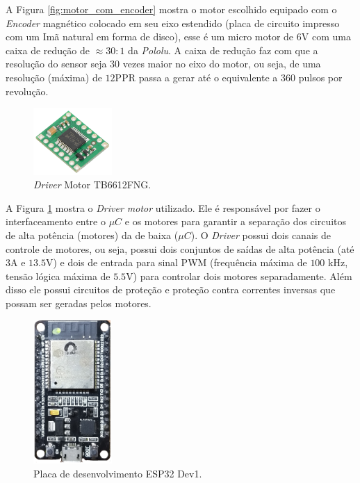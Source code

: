 A Figura \ref{fig:motor_com_encoder} mostra o motor escolhido equipado com o \textit{Encoder} magnético colocado em seu eixo estendido (placa de circuito impresso com um Imã natural em forma de disco), esse é um micro motor de $6$V com uma caixa de redução de $\approx 30:1$ da \textit{Pololu}\cite{Pololu}. A caixa de redução faz com que a resolução do sensor seja $30$ vezes maior no eixo do motor, ou seja, de uma resolução (máxima) de $12$PPR passa a gerar até o equivalente a $360$ pulsos por revolução.\\

\begin{figure}[H]
    \centering
    \includegraphics[width=3cm]{figuras/eletronica/driver.jpg}
    \caption{\textit{Driver} Motor TB6612FNG.}
    \label{fig:driver_motor}
\end{figure}

A Figura \ref{fig:driver_motor} mostra o \emph{Driver motor} utilizado. Ele é responsável por fazer o interfaceamento entre o $\mu{}C$ e os motores para garantir a separação dos circuitos de alta potência (motores) da de baixa ($\mu{}C$). O \emph{Driver} possui dois canais de controle de motores, ou seja, possui dois conjuntos de saídas de alta potência (até $3$A e $13.5$V) e dois de entrada para sinal PWM (frequência máxima de $100$ kHz, tensão lógica máxima de $5.5$V) para controlar dois motores separadamente. Além disso ele possui circuitos de proteção e proteção contra correntes inversas que possam ser geradas pelos motores.\\


\begin{figure}[H]
    \centering
    \includegraphics[width=3cm]{figuras/eletronica/esp32_kit.png}
    \caption{Placa de desenvolvimento ESP32 Dev1.}
    \label{fig:esp32_kit}
\end{figure}

